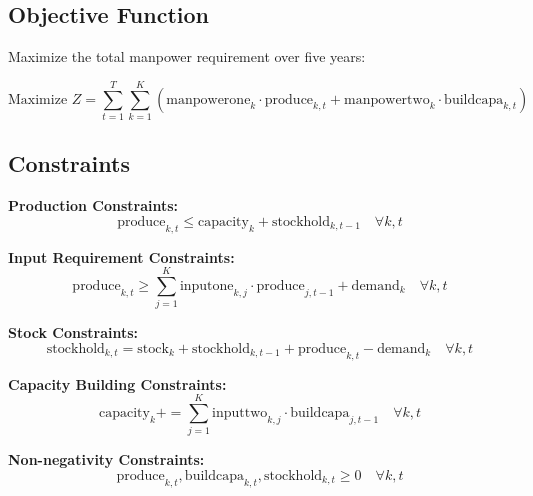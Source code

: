 \documentclass{article}
\begin{document}
\subsection*{Objective Function}
Maximize the total manpower requirement over five years:

\[
\text{Maximize } Z = \sum_{t=1}^{T} \sum_{k=1}^{K} \left( \text{manpowerone}_{k} \cdot \text{produce}_{k, t} + \text{manpowertwo}_{k} \cdot \text{buildcapa}_{k, t} \right)
\]

\subsection*{Constraints}

\textbf{Production Constraints:}
\[
\text{produce}_{k, t} \leq \text{capacity}_{k} + \text{stockhold}_{k, t-1} \quad \forall k, t
\]

\textbf{Input Requirement Constraints:}
\[
\text{produce}_{k, t} \geq \sum_{j=1}^{K} \text{inputone}_{k, j} \cdot \text{produce}_{j, t-1} + \text{demand}_{k} \quad \forall k, t
\]

\textbf{Stock Constraints:}
\[
\text{stockhold}_{k, t} = \text{stock}_{k} + \text{stockhold}_{k, t-1} + \text{produce}_{k, t} - \text{demand}_{k} \quad \forall k, t
\]

\textbf{Capacity Building Constraints:}
\[
\text{capacity}_{k} += \sum_{j=1}^{K} \text{inputtwo}_{k, j} \cdot \text{buildcapa}_{j, t-1} \quad \forall k, t
\]

\textbf{Non-negativity Constraints:}
\[
\text{produce}_{k, t}, \text{buildcapa}_{k, t}, \text{stockhold}_{k, t} \geq 0 \quad \forall k, t
\]
\end{document}
